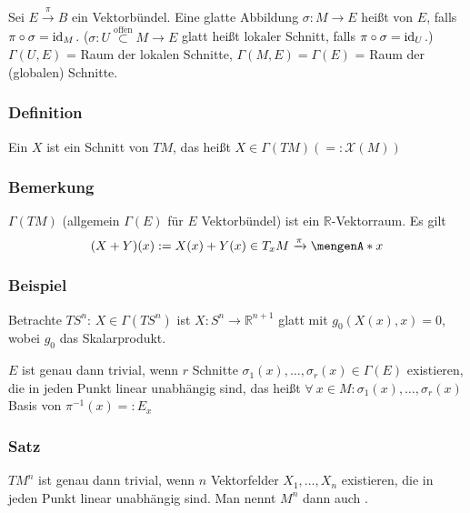 Sei $E \xrightarrow{\pi} B$ ein Vektorbündel. Eine glatte Abbildung $\sigma:M\to E$ heißt  von $E$, falls $\pi\circ \sigma = \operatorname{id}_M$. ($\sigma: U\overset{\text{offen}}{\subset} M \to E$ glatt heißt lokaler Schnitt, falls $\pi \circ \sigma = \operatorname{id}_U$.)\\
$\Gamma(U,E)$ = Raum der lokalen Schnitte, $\Gamma(M,E) = \Gamma(E)$ = Raum der (globalen) Schnitte.

\subsubsection[Definition: Vektorfeld]{Definition}
\label{ssub:141}
Ein  $X$ ist ein Schnitt von $TM$, das heißt $X\in \Gamma(TM) (=: \mathscr{X}(M))$

\subsubsection[Bemerkung: Vektorraumstruktur des $\Gamma(E)$]{Bemerkung}
\label{ssub:142}
$\Gamma(TM)$ (allgemein $\Gamma(E)$ für $E$ Vektorbündel) ist ein $\mathds{R}$-Vektorraum. Es gilt 
\[
(X + Y)(x) := X(x) + Y(x) \in T_x M \xrightarrow{\pi} \set{x}
\]

\subsubsection{Beispiel}
\label{ssub:143}
Betrachte $TS^n$:
$X\in \Gamma(TS^n)$ ist $X:S^n \to \mathds{R}^{n+1}$ glatt mit $g_0(X(x),x) = 0$, wobei $g_0$ das Skalarprodukt.

 $E$ ist genau dann trivial, wenn $r$ Schnitte $\sigma_1(x),\ldots,\sigma_r(x)\in \Gamma(E)$ existieren, die in jeden Punkt linear unabhängig sind, das heißt $\forall\ x\in M:\sigma_1(x),\ldots,\sigma_r(x)$ Basis von $\pi^{-1}(x) =: E_x$

\subsubsection[Satz: Parallelisierbarkeit des Tangentialbündels]{Satz}
\label{ssub:144}
$TM^n$ ist genau dann trivial, wenn $n$ Vektorfelder $X_1,\ldots,X_n$ existieren, die in jeden Punkt linear unabhängig sind. Man nennt $M^n$ dann auch .

